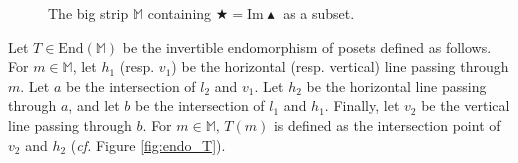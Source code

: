 \documentclass[11pt]{article}
\theoremstyle{remark}
\newcommand{\M}{\mathbb{M}}
\begin{document}
\begin{figure}






    \caption{The big strip $\M$ containing $\bigstar=\mathrm{Im}\blacktriangle$ as a subset.}
    \label{fig:big_strip}
\end{figure}

\noindent Let $T\in\mathrm{End}(\M)$ be the invertible endomorphism of posets defined as follows. For $m\in \M$, let $h_1$ (resp. $v_1$) be the horizontal (resp. vertical) line passing through $m$. Let $a$ be the intersection of $l_2$ and $v_1$. Let $h_2$ be the horizontal line passing through $a$, and let $b$ be the intersection of $l_1$ and $h_1$. Finally, let $v_2$ be the vertical line passing through $b$. For $m\in\M$, $T(m)$ is defined as the intersection point of $v_2$ and $h_2$ (\textit{cf.} Figure \ref{fig:endo_T}).
\end{document}
